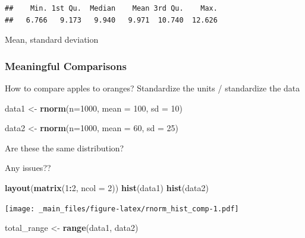 \documentclass[
]{book}
\newenvironment{Shaded}{\begin{snugshade}}{\end{snugshade}}
\newcommand{\DataTypeTok}[1]{\textcolor[rgb]{0.13,0.29,0.53}{#1}}
\newcommand{\DecValTok}[1]{\textcolor[rgb]{0.00,0.00,0.81}{#1}}
\newcommand{\KeywordTok}[1]{\textcolor[rgb]{0.13,0.29,0.53}{\textbf{#1}}}
\newcommand{\NormalTok}[1]{#1}
\newcommand{\OperatorTok}[1]{\textcolor[rgb]{0.81,0.36,0.00}{\textbf{#1}}}
\newcommand{\StringTok}[1]{\textcolor[rgb]{0.31,0.60,0.02}{#1}}
\begin{document}
\begin{verbatim}
##    Min. 1st Qu.  Median    Mean 3rd Qu.    Max. 
##   6.766   9.173   9.940   9.971  10.740  12.626
\end{verbatim}

Mean, standard deviation

\hypertarget{meaningful-comparisons}{%
\subsubsection{Meaningful Comparisons}\label{meaningful-comparisons}}

How to compare apples to oranges? Standardize the units / standardize the data

\begin{Shaded}
\begin{Highlighting}[]
\NormalTok{data1 <-}\StringTok{ }\KeywordTok{rnorm}\NormalTok{(}\DataTypeTok{n=}\DecValTok{1000}\NormalTok{, }
              \DataTypeTok{mean =} \DecValTok{100}\NormalTok{,}
              \DataTypeTok{sd =} \DecValTok{10}\NormalTok{)}

\NormalTok{data2 <-}\StringTok{ }\KeywordTok{rnorm}\NormalTok{(}\DataTypeTok{n=}\DecValTok{1000}\NormalTok{,}
               \DataTypeTok{mean =} \DecValTok{60}\NormalTok{, }
               \DataTypeTok{sd =} \DecValTok{25}\NormalTok{)}
\end{Highlighting}
\end{Shaded}

Are these the same distribution?

Any issues??

\begin{Shaded}
\begin{Highlighting}[]
\KeywordTok{layout}\NormalTok{(}\KeywordTok{matrix}\NormalTok{(}\DecValTok{1}\OperatorTok{:}\DecValTok{2}\NormalTok{, }\DataTypeTok{ncol =} \DecValTok{2}\NormalTok{))}
\KeywordTok{hist}\NormalTok{(data1)}
\KeywordTok{hist}\NormalTok{(data2)}
\end{Highlighting}
\end{Shaded}

\texttt{[image: \_main\_files/figure-latex/rnorm\_hist\_comp-1.pdf]}

\begin{Shaded}
\begin{Highlighting}[]
\NormalTok{total_range <-}\StringTok{ }\KeywordTok{range}\NormalTok{(data1, data2)}
\end{Highlighting}
\end{Shaded}
\end{document}
